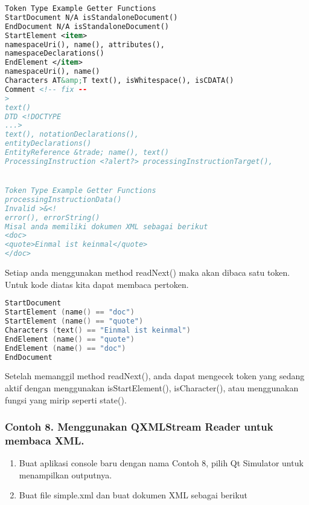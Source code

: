 \begin{lstlisting}[language=xml]
Token Type Example Getter Functions
StartDocument N/A isStandaloneDocument()
EndDocument N/A isStandaloneDocument()
StartElement <item>
namespaceUri(), name(), attributes(),
namespaceDeclarations()
EndElement </item>
namespaceUri(), name()
Characters AT&amp;T text(), isWhitespace(), isCDATA()
Comment <!-- fix --
>
text()
DTD <!DOCTYPE
...>
text(), notationDeclarations(),
entityDeclarations()
EntityReference &trade; name(), text()
ProcessingInstruction <?alert?> processingInstructionTarget(),


Token Type Example Getter Functions
processingInstructionData()
Invalid >&<!
error(), errorString()
Misal anda memiliki dokumen XML sebagai berikut
<doc>
<quote>Einmal ist keinmal</quote>
</doc>
\end{lstlisting}

Setiap anda menggunakan method readNext() maka akan dibaca satu token.
Untuk kode diatas kita dapat membaca pertoken.

\begin{lstlisting}[language=c++]
StartDocument
StartElement (name() == "doc")
StartElement (name() == "quote")
Characters (text() == "Einmal ist keinmal")
EndElement (name() == "quote")
EndElement (name() == "doc")
EndDocument
\end{lstlisting}

Setelah memanggil method readNext(), anda dapat mengecek token yang
sedang aktif dengan menggunakan isStartElement(), isCharacter(), atau
menggunakan fungsi yang mirip seperti state().

\subsubsection*{Contoh 8. Menggunakan QXMLStream Reader untuk membaca XML.}

\begin{enumerate}
\def\labelenumi{\arabic{enumi}.}
\tightlist
\item
  Buat aplikasi console baru dengan nama Contoh 8, pilih Qt Simulator
  untuk menampilkan outputnya.
\item
  Buat file simple.xml dan buat dokumen XML sebagai berikut
\end{enumerate}




